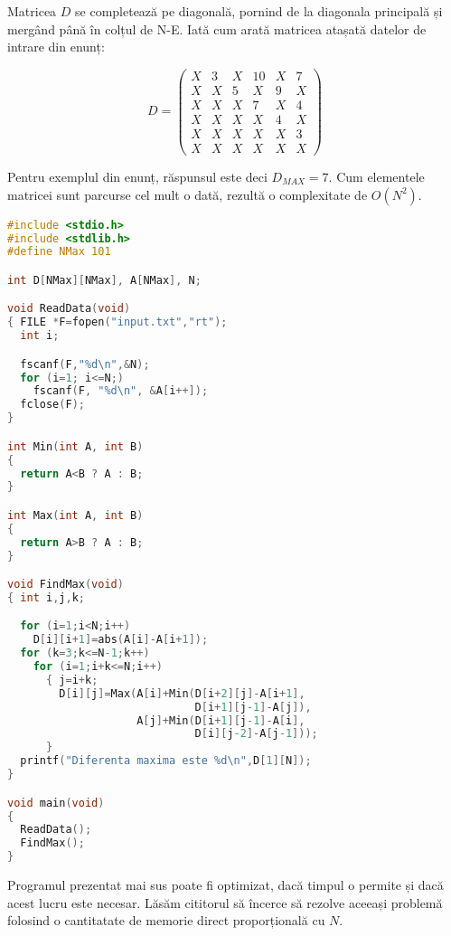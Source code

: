 Matricea $D$ se completează pe diagonală, pornind de la diagonala principală
și mergând până în colțul de N-E. Iată cum arată matricea atașată datelor de
intrare din enunț:

\begin{equation}
  D =
  \begin{pmatrix}
    X & 3 & X & 10 & X & 7 \\
    X & X & 5 & X & 9 & X \\
    X & X & X & 7 & X & 4 \\
    X & X & X & X & 4 & X \\
    X & X & X & X & X & 3 \\
    X & X & X & X & X & X
  \end{pmatrix}
\end{equation}

Pentru exemplul din enunț, răspunsul este deci $D_{MAX}=7$. Cum elementele
matricei sunt parcurse cel mult o dată, rezultă o complexitate de $O(N^2)$.

\begin{lstlisting}[language=C]
#include <stdio.h>
#include <stdlib.h>
#define NMax 101

int D[NMax][NMax], A[NMax], N;

void ReadData(void)
{ FILE *F=fopen("input.txt","rt");
  int i;

  fscanf(F,"%d\n",&N);
  for (i=1; i<=N;)
    fscanf(F, "%d\n", &A[i++]);
  fclose(F);
}

int Min(int A, int B)
{
  return A<B ? A : B;
}

int Max(int A, int B)
{
  return A>B ? A : B;
}

void FindMax(void)
{ int i,j,k;

  for (i=1;i<N;i++)
    D[i][i+1]=abs(A[i]-A[i+1]);
  for (k=3;k<=N-1;k++)
    for (i=1;i+k<=N;i++)
      { j=i+k;
        D[i][j]=Max(A[i]+Min(D[i+2][j]-A[i+1],
                             D[i+1][j-1]-A[j]),
                    A[j]+Min(D[i+1][j-1]-A[i],
                             D[i][j-2]-A[j-1]));
      }
  printf("Diferenta maxima este %d\n",D[1][N]);
}

void main(void)
{
  ReadData();
  FindMax();
}
\end{lstlisting}

Programul prezentat mai sus poate fi optimizat, dacă timpul o permite și dacă
acest lucru este necesar. Lăsăm cititorul să încerce să rezolve aceeași
problemă folosind o cantitatate de memorie direct proporțională cu $N$.
